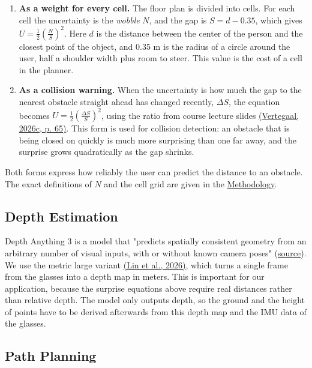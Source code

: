 \documentclass[a4paper]{article}
\begin{document}
\begin{enumerate}
	\item \textbf{As a weight for every cell.} The floor plan is divided into cells. For each cell the uncertainty is the \textit{wobble} $N$, and the gap is $S = d - 0.35$, which gives $U=\frac{1}{2}\left( \frac{N}{S} \right)^2$. Here $d$ is the distance between the center of the person and the closest point of the object, and 0.35 m is the radius of a circle around the user, half a shoulder width plus room to steer. This value is the cost of a cell in the planner.
	\item \textbf{As a collision warning.} When the uncertainty is how much the gap to the nearest obstacle straight ahead has changed recently, $\Delta S$, the equation becomes $U=\frac{1}{2}\left( \frac{\Delta S}{S} \right)^2$, using the ratio from course lecture slides \hyperref[references]{(Vertegaal, 2026c, p. 65)}. This form is used for collision detection: an obstacle that is being closed on quickly is much more surprising than one far away, and the surprise grows quadratically as the gap shrinks.
\end{enumerate}

Both forms express how reliably the user can predict the distance to an obstacle. The exact definitions of $N$ and the cell grid are given in the \hyperref[methodology]{Methodology}.

\subsection{Depth Estimation} \label{depth-estimation}

Depth Anything 3 is a model that "predicts spatially consistent geometry from an arbitrary number of visual inputs, with or without known camera poses" (\href{https://depth-anything-3.github.io/}{source}). We use the metric large variant \hyperref[references]{(Lin et al., 2026)}, which turns a single frame from the glasses into a depth map in meters. This is important for our application, because the surprise equations above require real distances rather than relative depth. The model only outputs depth, so the ground and the height of points have to be derived afterwards from this depth map and the IMU data of the glasses.

\subsection{Path Planning} \label{path-planning}
\end{document}
